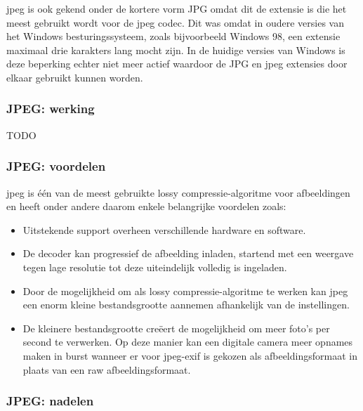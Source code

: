 \gls{jpeg} is ook gekend onder de kortere vorm JPG omdat dit de extensie is die het meest gebruikt wordt voor de \gls{jpeg} \gls{codec}. Dit was omdat in oudere versies van het Windows besturingssysteem, zoals bijvoorbeeld Windows 98, een \gls{extensie} maximaal drie karakters lang mocht zijn. In de huidige versies van Windows is deze beperking echter niet meer actief waardoor de JPG en \gls{jpeg} \glspl{extensie} door elkaar gebruikt kunnen worden.

\subsubsection{JPEG: werking}
\label{sec:afbeeldingscompressie-jpeg-werking}

TODO

\subsubsection{JPEG: voordelen}
\label{sec:afbeeldingscompressie-jpeg-voordelen}

\Gls{jpeg} is één van de meest gebruikte \gls{lossy} \gls{compressie-algoritme} voor afbeeldingen en heeft onder andere daarom enkele belangrijke voordelen zoals:

\begin{itemize}
	\item Uitstekende support overheen verschillende hardware en software.
	
	\item De  \gls{decoder} kan progressief de afbeelding inladen, startend met een weergave tegen lage resolutie tot deze uiteindelijk volledig is ingeladen.
	
	\item Door de mogelijkheid om als \gls{lossy} \gls{compressie-algoritme} te werken kan \gls{jpeg} een enorm kleine bestandsgrootte aannemen afhankelijk van de instellingen.
	
	\item De kleinere bestandsgrootte creëert de mogelijkheid om meer foto's per second te verwerken. Op deze manier kan een digitale camera meer opnames maken in burst wanneer er voor \gls{jpeg-exif} is gekozen als \gls{afbeeldingsformaat} in plaats van een \gls{raw} \gls{afbeeldingsformaat}. 
\end{itemize}

\subsubsection{JPEG: nadelen}
\label{sec:afbeeldingscompressie-jpeg-nadelen}

